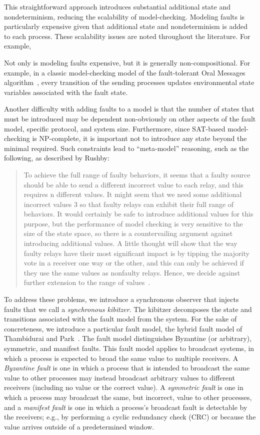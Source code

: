 \documentclass{IEEEtran/IEEEtran}
\newcommand{\lee}[1]{ } %
\newcommand{\lee}[1]{ {\color{blue}$<$lee: #1$>$} } %
\begin{document}
This straightforward approach introduces substantial additional state and nondeterminism, reducing the scalability of model-checking. Modeling faults is particularly expensive given that additional state and nondeterminism is added to each process. These scalability issues are noted throughout the literature. For example, \lee{TTA startup paper, helmut's paper, etc.}

Not only is modeling faults expensive, but it is generally non-compositional. For example, in a classic model-checking model of the fault-tolerant Oral Messages algorithm~\cite{}, every transition of the sending processes updates environmental state variables associated with the fault state.

Another difficulty with adding faults to a model is that the number of states that must be introduced may be dependent non-obviously on other aspects of the fault model, specific protocol, and system size. Furthermore, since SAT-based model-checking is NP-complete, it is important not to introduce any state beyond the minimal required. Such constraints lead to ``meta-model'' reasoning, such as the following, as described by Rushby:

\begin{quote}
To achieve the full range of faulty behaviors, it seems that a faulty source should be able to send a different incorrect value to each relay, and this requires n different values. It might seem that we need some additional incorrect values 3 so that faulty relays can exhibit their full range of behaviors. It would certainly be safe to introduce additional values for this purpose, but the performance of model checking is very sensitive to the size of the state space, so there is a countervailing argument against introducing additional values. A little thought will show that the way faulty relays have their most significant impact is by tipping the majority vote in a receiver one way or the other, and this can only be achieved if they use the same values as nonfaulty relays. Hence, we decide against further extension to the range of values~\cite{}.
\end{quote}

To address these problems, we introduce a synchronous observer that injects faults that we call a \emph{synchronous kibitzer}. The kibitzer decomposes the state and transitions associated with the fault model from the system. For the sake of concreteness, we introduce a particular fault model, the hybrid fault model of Thambidurai and Park~\cite{}. The fault model distinguishes Byzantine (or arbitrary), symmetric, and manifest faults. This fault model applies to broadcast systems, in which a process is expected to broad the same value to multiple receivers. A \emph{Byzantine fault} is one in which a process that is intended to broadcast the same value to other processes may instead broadcast arbitrary values to different receivers (including no value or the correct value). A \emph{symmetric fault} is one in which a process may broadcast the same, but incorrect, value to other processes, and a \emph{manifest fault} is one in which a process's broadcast fault is detectable by the receivers; e.g., by performing a cyclic redundancy check (CRC) or because the value arrives outside of a predetermined window.
\end{document}
